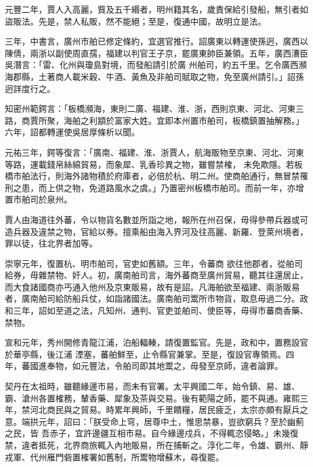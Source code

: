 \begin{pinyinscope}
 元豐二年，賈人入高麗，貲及五千緡者，明州籍其名，歲責保給引發船，無引者如盜販法。先是，禁人私販，然不能絕；至是，復通中國，故明立是法。



 三年，中書言，廣州市舶已修定條約，宜選官推行。詔廣東以轉運使孫迥，廣西以陳倩，兩浙以副使周直孺，福建以判官王子京，罷廣東帥臣兼領。五年，廣西漕臣吳潛言：「雷、化州與瓊島對境，而發船請引於廣
 州舶司，約五千里。乞令廣西瀕海郡縣，土著商人載米穀、牛酒、黃魚及非舶司賦取之物，免至廣州請引。」詔孫迥詳度行之。



 知密州範鍔言：「板橋瀕海，東則二廣、福建、淮、浙，西則京東、河北、河東三路，商賈所聚，海舶之利顓於富家大姓。宜即本州置市舶司，板橋鎮置抽解務。」六年，詔都轉運使吳居厚條析以聞。



 元祐三年，鍔等復言：「廣南、福建、淮、浙賈人，航海販物至京東、河北、河東等路，運載錢帛絲綿貿易，而象犀、乳香珍異之物，雖嘗禁榷，
 未免欺隱。若板橋市舶法行，則海外諸物積於府庫者，必倍於杭、明二州。使商舶通行，無冒禁罹刑之患，而上供之物，免道路風水之虞。」乃置密州板橋市舶司。而前一年，亦增置市舶司於泉州。



 賈人由海道往外蕃，令以物貨名數並所詣之地，報所在州召保，毋得參帶兵器或可造兵器及違禁之物，官給以券。擅乘船由海入界河及往高麗、新羅、登萊州境者，罪以徒，往北界者加等。



 崇寧元年，復置杭、明市舶司，官吏如舊額。三年，令蕃商
 欲往他郡者，從舶司給券，毋雜禁物、奸人。初，廣南舶司言，海外蕃商至廣州貿易，聽其往還居止，而大食諸國商亦丐通入他州及京東販易，故有是詔。凡海舶欲至福建、兩浙販易者，廣南舶司給防船兵仗，如詣諸國法。廣南舶司鬻所市物貨，取息毋過二分。政和三年，詔如至道之法，凡知州、通判、官吏並舶司、使臣等，毋得市蕃商香藥、禁物。



 宣和元年，秀州開修青龍江浦，泊船輻輳，請復置監官。先是，政和中，置務設官於華亭縣，後江浦
 湮塞，蕃舶鮮至，止令縣官兼掌。至是，復設官專領焉。四年，蕃國進奉物，如元豐法，令舶司即其地鬻之，毋發至京師，違者論罪。



 契丹在太祖時，雖聽緣邊市易，而未有官署。太平興國二年，始令鎮、易、雄、霸、滄州各置榷務，輦香藥、犀象及茶與交易。後有範陽之師，罷不與通。雍熙三年，禁河北商民與之貿易。時累年興師，千里饋糧，居民疲乏，太宗亦頗有厭兵之意。端拱元年，詔曰：「朕受命上穹，居尊中土，惟思禁暴，豈欲窮兵？至於幽薊之民，皆
 吾赤子，宜許邊疆互相市易。自今緣邊戍兵，不得輒恣侵略。」未幾復禁，違者抵死，北界商旅輒入內地販易，所在捕斬之。淳化二年，令雄、霸州、靜戎軍、代州雁門砦置榷署如舊制，所鬻物增蘇木，尋復罷。




\end{pinyinscope}
